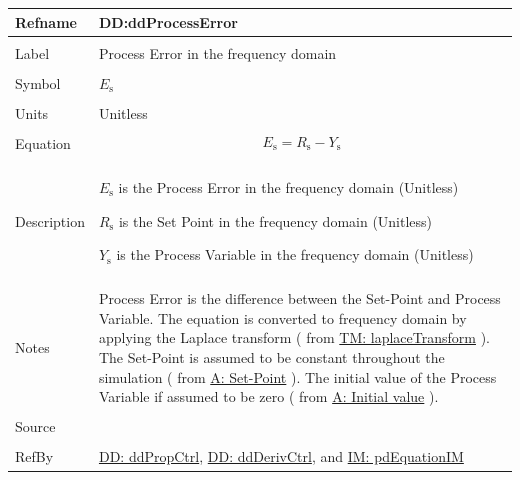 \documentclass[12pt]{article}
\begin{document}
\vspace{\baselineskip}
\noindent
\begin{minipage}{\textwidth}
\begin{tabular}{>{\raggedright}p{}>{\raggedright\arraybackslash}p{}}
\toprule \textbf{Refname} & \textbf{DD:ddProcessError}
\label{DD:ddProcessError}
\\ \midrule \\
Label & Process Error in the frequency domain
        
\\ \midrule \\
Symbol & ${E_{\text{s}}}$
         
\\ \midrule \\
Units & Unitless
        
\\ \midrule \\
Equation & \begin{displaymath}
           {E_{\text{s}}}={R_{\text{s}}}-{Y_{\text{s}}}
           \end{displaymath}
\\ \midrule \\
Description & \begin{symbDescription}
              \item{${E_{\text{s}}}$ is the Process Error in the frequency domain (Unitless)}
              \item{${R_{\text{s}}}$ is the Set Point in the frequency domain (Unitless)}
              \item{${Y_{\text{s}}}$ is the Process Variable in the frequency domain (Unitless)}
              \end{symbDescription}
\\ \midrule \\
Notes & Process Error is the difference between the Set-Point and  Process Variable. The equation is converted to frequency domain by applying the Laplace transform ( from \hyperref[TM:laplaceTransform]{TM: laplaceTransform} ). The Set-Point is assumed to be constant throughout the simulation ( from  \hyperref[setPoint]{A: Set-Point} ). The initial value of the Process Variable if assumed to be zero ( from  \hyperref[initialValue]{A: Initial value} ).
        
\\ \midrule \\
Source & \cite{johnson2008}
         
\\ \midrule \\
RefBy & \hyperref[DD:ddPropCtrl]{DD: ddPropCtrl}, \hyperref[DD:ddDerivCtrl]{DD: ddDerivCtrl}, and \hyperref[IM:pdEquationIM]{IM: pdEquationIM}
        
\\ \bottomrule
\end{tabular}
\end{minipage}
\end{document}
